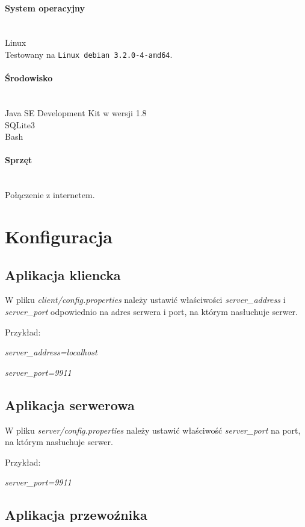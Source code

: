 \documentclass[pdftex,13pt,a4paper]{article}
\begin{document}
\paragraph{System operacyjny}\mbox{}\\
	Linux\\
	Testowany na \texttt{Linux debian 3.2.0-4-amd64}.

\paragraph{Środowisko}\mbox{}\\
	Java SE Development Kit w wersji 1.8\\
	SQLite3\\
	Bash

\paragraph{Sprzęt}\mbox{}\\
	Połączenie z internetem.
	
\section{Konfiguracja}

\subsection{Aplikacja kliencka}

	W pliku \emph{client/config.properties} należy ustawić właściwości 	\emph{server\_address} i \emph{server\_port} odpowiednio na adres serwera i port, na którym nasłuchuje serwer. 
  
  Przykład: 
  
  \emph{server\_address=localhost}  
  
  \emph{server\_port=9911}
  
\subsection{Aplikacja serwerowa}

	W pliku \emph{server/config.properties} należy ustawić właściwość \emph{server\_port} na port, na którym nasłuchuje serwer. 
  
  Przykład: 
  
  \emph{server\_port=9911}

\subsection{Aplikacja przewoźnika}
\end{document}
